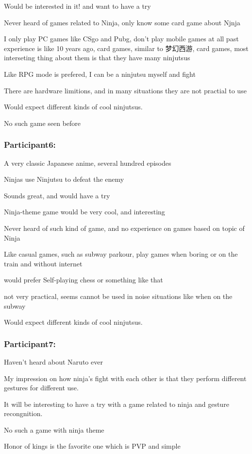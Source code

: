 \documentclass[UTF8,a4paper,12pt]{ctexart}
\numberwithin{equation}{section}
\begin{document}
Would be interested in it! and want to have a try

Never heard of games related to Ninja, only know some card game about Njnja

I only play PC games like CSgo and Pubg, don't play mobile games at all
past experience is like 10 years ago, card games, similar to 梦幻西游, card games, most interseting thing about them is that they have many ninjutsus

Like RPG mode is prefered, I can be a ninjutsu myself and fight

There are hardware limitions, and in many situations they are not practial to use

Would expect different kinds of cool ninjutsus.

No such game seen before

\subsubsection*{Participant6:}
A very classic Japanese anime, several hundred episodes

Ninjas use Ninjutsu to defeat the enemy

Sounds great, and would have a try

Ninja-theme game would be very cool, and interesting

Never heard of such kind of game, and no experience on games based on topic of Ninja

Like casual games, such as subway parkour, play games when boring or on the train and without internet

would prefer Self-playing chess or something like that

not very practical, seems cannot be used in noise situations like when on the subway

Would expect different kinds of cool ninjutsus.

\subsubsection*{Participant7:}
Haven't heard about Naruto ever

My impression on how ninja's fight with each other is that they perform different gestures for different use.

It will be interesting to have a try with a game related to ninja and gesture recongnition.

No such a game with ninja theme

Honor of kings is the favorite one which is PVP and simple
\end{document}
